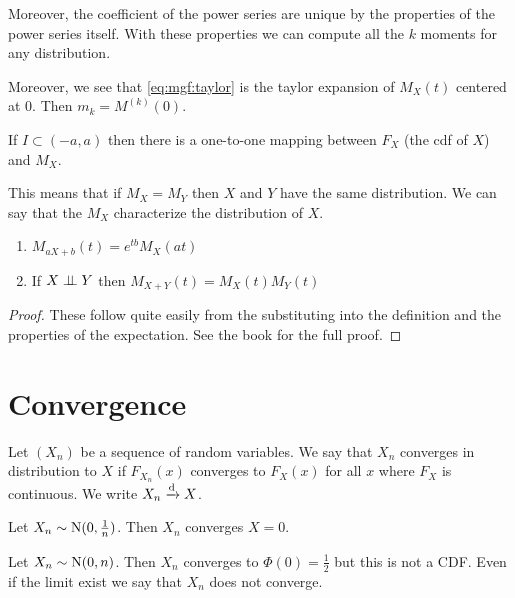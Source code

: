\documentclass[12pt]{extarticle}
\newcommand{\Normal}{{\operatorfont N}}
\newcommand{\convdist}{\xrightarrow{\operatorfont d}}
\begin{document}
Moreover, the coefficient of the power series are unique by the properties of the power series itself.
With these properties we can compute all the $k$ moments for any distribution.

Moreover, we see that \autoref{eq:mgf:taylor} is the taylor expansion of $M_X(t)$ centered at $0$. Then $m_k = M^{(k)}(0)$.

\begin{proposition}
    If $I \subset (-a, a)$ then there is a one-to-one mapping between $F_X$ (the cdf of $X$) and $M_X$.

    This means that if $M_X = M_Y$ then $X$ and $Y$ have the same distribution.
    We can say that the $M_X$ characterize the distribution of $X$.
\end{proposition}

\begin{proposition}
    \label{prop:mgf:props_of_mgf}
    \skiplineafterproof
    \begin{enumerate}
        \item $M_{aX + b}(t) = e^{tb} M_X (at)$
        \item If $X \perp \!\!\! \perp Y$ then $M_{X+Y}(t) = M_X(t) M_Y(t)$
    \end{enumerate}
\end{proposition}
\begin{proof}
    These follow quite easily from the substituting into the definition and the properties of the expectation.
    See the book for the full proof.
\end{proof}

\section{Convergence}

\begin{definition}
    Let $\left(X_n\right)$ be a sequence of random variables.
    We say that $X_n$ converges in distribution to $X$ if $F_{X_n}(x)$ converges to $F_X(x)$ for all $x$ where $F_X$ is continuous.
    We write $X_n \convdist X$.
\end{definition}

\begin{example}
    Let $X_n \sim \Normal(0, \frac{1}{n})$.
    Then $X_n$ converges $X = 0$.
\end{example}
\begin{example}
    Let $X_n \sim \Normal(0, n)$.
    Then $X_n$ converges to $\Phi(0) = \frac{1}{2}$ but this is not a CDF.
    Even if the limit exist we say that $X_n$ does not converge.
\end{example}
\end{document}
